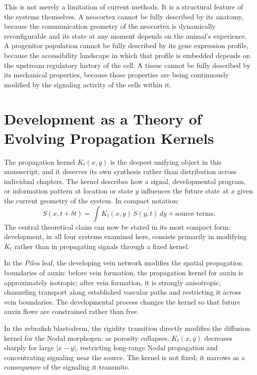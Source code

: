\documentclass[12pt, a4paper, openany]{book}
\theoremstyle{definition}
\theoremstyle{remark}
\begin{document}
This is not merely a limitation of current methods. It is a structural feature of the systems themselves. A neocortex cannot be fully described by its anatomy, because the communication geometry of the neocortex is dynamically reconfigurable and its state at any moment depends on the animal's experience. A progenitor population cannot be fully described by its gene expression profile, because the accessibility landscape in which that profile is embedded depends on the upstream regulatory history of the cell. A tissue cannot be fully described by its mechanical properties, because those properties are being continuously modified by the signaling activity of the cells within it.

\section{Development as a Theory of Evolving Propagation Kernels}

The propagation kernel $K_t(x,y)$ is the deepest unifying object in this manuscript, and it deserves its own synthesis rather than distribution across individual chapters. The kernel describes how a signal, developmental program, or information pattern at location or state $y$ influences the future state at $x$ given the current geometry of the system. In compact notation:
\begin{equation}
S(x, t+\delta t) = \int K_t(x,y)\,S(y,t)\,dy + \text{source terms}.
\end{equation}
The central theoretical claim can now be stated in its most compact form: development, in all four systems examined here, consists primarily in modifying $K_t$ rather than in propagating signals through a fixed kernel.

In the \textit{Pilea} leaf, the developing vein network modifies the spatial propagation boundaries of auxin: before vein formation, the propagation kernel for auxin is approximately isotropic; after vein formation, it is strongly anisotropic, channeling transport along established vascular paths and restricting it across vein boundaries. The developmental process changes the kernel so that future auxin flows are constrained rather than free.

In the zebrafish blastoderm, the rigidity transition directly modifies the diffusion kernel for the Nodal morphogen: as porosity collapses, $K_t(x,y)$ decreases sharply for large $|x-y|$, restricting long-range Nodal propagation and concentrating signaling near the source. The kernel is not fixed; it narrows as a consequence of the signaling it transmits.
\end{document}
